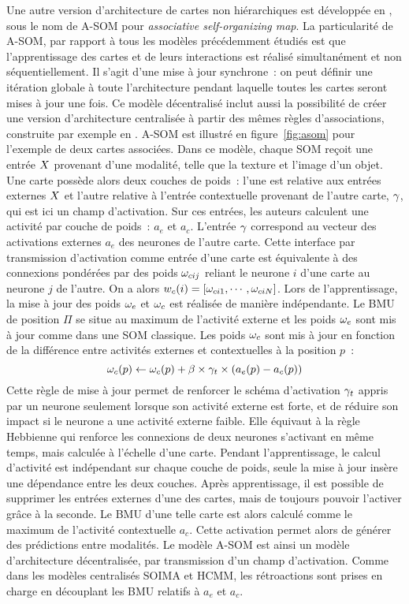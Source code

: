 \documentclass[../main]{subfiles}
\begin{document}
Une autre version d'architecture de cartes non hiérarchiques est développée en \cite{johnsson_associating_2008,johnsson_associative_2009}, sous le nom de A-SOM pour \emph{associative self-organizing map}. 
La particularité de A-SOM, par rapport à tous les modèles précédemment étudiés est que l'apprentissage des cartes et de leurs interactions est réalisé simultanément et non séquentiellement. Il s'agit d'une mise à jour synchrone~: on peut définir une itération globale à toute l'architecture pendant laquelle toutes les cartes seront mises à jour une fois.
Ce modèle décentralisé inclut aussi la possibilité de créer une version d'architecture centralisée à partir des mêmes règles d'associations, construite par exemple en \cite{buonamente_hierarchies_2016}. A-SOM est illustré en figure~\ref{fig:asom} pour l'exemple de deux cartes associées. 
Dans ce modèle, chaque SOM reçoit une entrée $X$ provenant d'une modalité, telle que la texture et l'image d'un objet. Une carte possède alors deux couches de poids~: l'une est relative aux entrées externes $X$ et l'autre relative à l'entrée contextuelle provenant de l'autre carte, $\gamma$, qui est ici un champ d'activation.
Sur ces entrées, les auteurs calculent une activité par couche de poids~: $a_e$ et $a_c$.
L'entrée $\gamma$ correspond au vecteur des activations externes $a_e$ des neurones de l'autre carte.
Cette interface par transmission d'activation comme entrée d'une carte est équivalente à des connexions pondérées par des poids $\omega_{cij}$ reliant le neurone $i$ d'une carte au neurone $j$ de l'autre. 
On a alors $w_c(i) = [\omega_{ci1}, \cdots, \omega_{ciN}]$.
Lors de l'apprentissage, la mise à jour des poids $\omega_e$ et $\omega_c$ est réalisée de manière indépendante. 
Le BMU de position $\Pi$ se situe au maximum de l'activité externe et les poids $\omega_e$ sont mis à jour comme dans une SOM classique.
Les poids $\omega_c$ sont mis à jour en fonction de la différence entre activités externes et contextuelles à la position $p$~:
$$ \omega_c(p) \leftarrow \omega_c(p) + \beta \times \gamma_t \times (a_e(p) - a_c(p))$$
Cette règle de mise à jour permet de renforcer le schéma d'activation $\gamma_t$ appris par un neurone seulement lorsque son activité externe est forte, et de réduire son impact si le neurone a une activité externe faible. Elle équivaut à la règle Hebbienne qui renforce les connexions de deux neurones s'activant en même temps, mais calculée à l'échelle d'une carte.
Pendant l'apprentissage, le calcul d'activité est indépendant sur chaque couche de poids, seule la mise à jour insère une dépendance entre les deux couches.
Après apprentissage, il est possible de supprimer les entrées externes d'une des cartes, mais de toujours pouvoir l'activer grâce à la seconde. Le BMU d'une telle carte est alors calculé comme le maximum de l'activité contextuelle $a_c$. Cette activation permet alors de générer des prédictions entre modalités.
Le modèle A-SOM est ainsi un modèle d'architecture décentralisée, par transmission d'un champ d'activation. Comme dans les modèles centralisés SOIMA et HCMM, les rétroactions sont prises en charge en découplant les BMU relatifs à $a_e$ et $a_c$.
\end{document}
